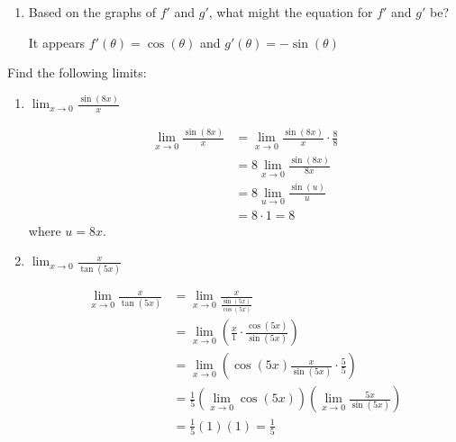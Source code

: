 \documentclass[nooutcomes]{ximera}
\begin{document}
\begin{problem}
\begin{enumerate}
	\item Based on the graphs of $f'$ and $g'$, what might the equation for $f'$ and $g'$ be?
		\begin{freeResponse}
			It appears $f'(\theta)=\cos(\theta)$ and $g'(\theta)=-\sin(\theta)$
		\end{freeResponse}


\end{enumerate}
\end{problem}


\begin{problem}
Find the following limits:

	\begin{enumerate}
	
	\item  $\lim_{x \to 0} \frac{\sin(8x)}{x}$
			\begin{freeResponse}
			\begin{align*}
			\lim_{x \to 0} \frac{\sin(8x)}{x} &= \lim_{x \to 0} \frac{\sin(8x)}{x} \cdot \frac{8}{8}  \\
			&= 8 \lim_{x \to 0} \frac{\sin(8x)}{8x}  \\
			&= 8 \lim_{u \to 0} \frac{\sin(u)}{u}  \\
			&= 8 \cdot 1 = 8
			\end{align*}
			where $u = 8x$.  
			\end{freeResponse}
			
	
	\item  $\lim_{x \to 0} \frac{x}{\tan(5x)}$
			\begin{freeResponse}
			\begin{align*}
			\lim_{x \to 0} \frac{x}{\tan(5x)} &= \lim_{x \to 0} \frac{x}{\frac{\sin(5x)}{\cos(5x)}}  \\
			&= \lim_{x \to 0} \left( \frac{x}{1} \cdot \frac{\cos(5x)}{\sin(5x)} \right)  \\
			&= \lim_{x \to 0} \left( \cos(5x) \frac{x}{\sin(5x)} \cdot \frac{5}{5} \right)  \\
			&= \frac{1}{5} \left( \lim_{x \to 0} \cos(5x) \right) \left( \lim_{x \to 0} \frac{5x}{\sin(5x)} \right)  \\
			&= \frac{1}{5} (1) (1) = \frac{1}{5}
			\end{align*}
			\end{freeResponse}
			
			
			
	\end{enumerate}
\end{problem}
	
\end{document}

